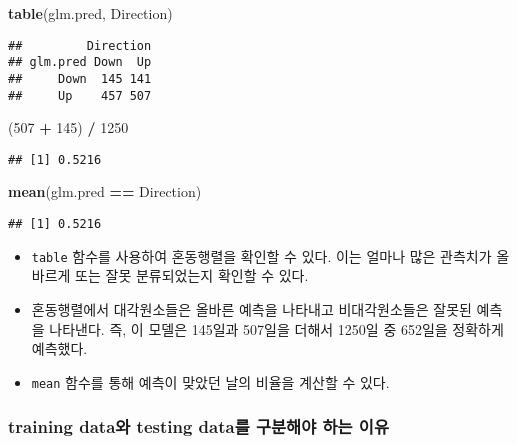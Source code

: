 \documentclass[]{article}
\newenvironment{Shaded}{\begin{snugshade}}{\end{snugshade}}
\newcommand{\KeywordTok}[1]{\textcolor[rgb]{0.13,0.29,0.53}{\textbf{#1}}}
\newcommand{\DecValTok}[1]{\textcolor[rgb]{0.00,0.00,0.81}{#1}}
\newcommand{\StringTok}[1]{\textcolor[rgb]{0.31,0.60,0.02}{#1}}
\newcommand{\OperatorTok}[1]{\textcolor[rgb]{0.81,0.36,0.00}{\textbf{#1}}}
\newcommand{\NormalTok}[1]{#1}
\providecommand{\tightlist}{%
  \setlength{\itemsep}{0pt}\setlength{\parskip}{0pt}}
\begin{document}
\begin{Shaded}
\begin{Highlighting}[]
\KeywordTok{table}\NormalTok{(glm.pred, Direction)}
\end{Highlighting}
\end{Shaded}

\begin{verbatim}
##         Direction
## glm.pred Down  Up
##     Down  145 141
##     Up    457 507
\end{verbatim}

\begin{Shaded}
\begin{Highlighting}[]
\NormalTok{(}\DecValTok{507} \OperatorTok{+}\StringTok{ }\DecValTok{145}\NormalTok{) }\OperatorTok{/}\StringTok{ }\DecValTok{1250}
\end{Highlighting}
\end{Shaded}

\begin{verbatim}
## [1] 0.5216
\end{verbatim}

\begin{Shaded}
\begin{Highlighting}[]
\KeywordTok{mean}\NormalTok{(glm.pred }\OperatorTok{==}\StringTok{ }\NormalTok{Direction)}
\end{Highlighting}
\end{Shaded}

\begin{verbatim}
## [1] 0.5216
\end{verbatim}

\begin{itemize}
\tightlist
\item
  \texttt{table} 함수를 사용하여 혼동행렬을 확인할 수 있다. 이는 얼마나
  많은 관측치가 올바르게 또는 잘못 분류되었는지 확인할 수 있다.
\item
  혼동행렬에서 대각원소들은 올바른 예측을 나타내고 비대각원소들은 잘못된
  예측을 나타낸다. 즉, 이 모델은 145일과 507일을 더해서 1250일 중
  652일을 정확하게 예측했다.
\item
  \texttt{mean} 함수를 통해 예측이 맞았던 날의 비율을 계산할 수 있다.
\end{itemize}

\subsubsection{training data와 testing data를 구분해야 하는
이유}\label{training-data-testing-data---}
\end{document}
